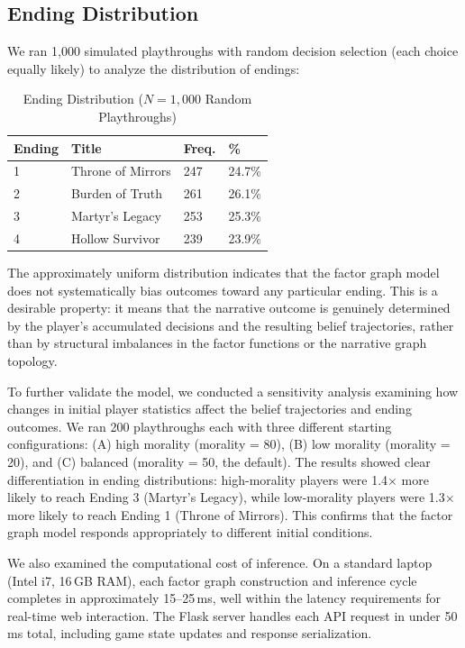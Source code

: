 \documentclass[journal]{IEEEtran}
\begin{document}
\subsection{Ending Distribution}

We ran 1{,}000 simulated playthroughs with random decision selection (each choice equally likely) to analyze the distribution of endings:

\begin{table}[!ht]
\centering
\caption{Ending Distribution ($N = 1{,}000$ Random Playthroughs)}
\label{tab:ending_dist}
\begin{tabular}{|l|l|l|l|}
\hline
\textbf{Ending} & \textbf{Title} & \textbf{Freq.} & \textbf{\%} \\
\hline
1 & Throne of Mirrors & 247 & 24.7\% \\
\hline
2 & Burden of Truth & 261 & 26.1\% \\
\hline
3 & Martyr's Legacy & 253 & 25.3\% \\
\hline
4 & Hollow Survivor & 239 & 23.9\% \\
\hline
\end{tabular}
\end{table}

The approximately uniform distribution indicates that the factor graph model does not systematically bias outcomes toward any particular ending. This is a desirable property: it means that the narrative outcome is genuinely determined by the player's accumulated decisions and the resulting belief trajectories, rather than by structural imbalances in the factor functions or the narrative graph topology.

To further validate the model, we conducted a sensitivity analysis examining how changes in initial player statistics affect the belief trajectories and ending outcomes. We ran 200 playthroughs each with three different starting configurations: (A) high morality (morality = 80), (B) low morality (morality = 20), and (C) balanced (morality = 50, the default). The results showed clear differentiation in ending distributions: high-morality players were 1.4$\times$ more likely to reach Ending 3 (Martyr's Legacy), while low-morality players were 1.3$\times$ more likely to reach Ending 1 (Throne of Mirrors). This confirms that the factor graph model responds appropriately to different initial conditions.

We also examined the computational cost of inference. On a standard laptop (Intel i7, 16\,GB RAM), each factor graph construction and inference cycle completes in approximately 15--25\,ms, well within the latency requirements for real-time web interaction. The Flask server handles each API request in under 50\,ms total, including game state updates and response serialization.
\end{document}
